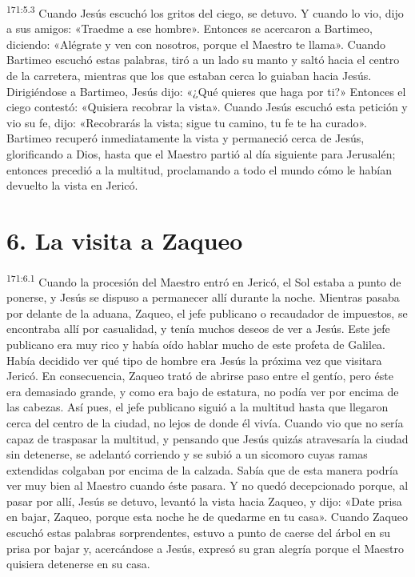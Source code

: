 \par 
\textsuperscript{171:5.3} Cuando Jesús escuchó los gritos del ciego, se detuvo. Y cuando lo vio, dijo a sus amigos: «Traedme a ese hombre». Entonces se acercaron a Bartimeo, diciendo: «Alégrate y ven con nosotros, porque el Maestro te llama». Cuando Bartimeo escuchó estas palabras, tiró a un lado su manto y saltó hacia el centro de la carretera, mientras que los que estaban cerca lo guiaban hacia Jesús. Dirigiéndose a Bartimeo, Jesús dijo: «¿Qué quieres que haga por ti?» Entonces el ciego contestó: «Quisiera recobrar la vista». Cuando Jesús escuchó esta petición y vio su fe, dijo: «Recobrarás la vista; sigue tu camino, tu fe te ha curado». Bartimeo recuperó inmediatamente la vista y permaneció cerca de Jesús, glorificando a Dios, hasta que el Maestro partió al día siguiente para Jerusalén; entonces precedió a la multitud, proclamando a todo el mundo cómo le habían devuelto la vista en Jericó.

\section*{6. La visita a Zaqueo}
\par 
\textsuperscript{171:6.1} Cuando la procesión del Maestro entró en Jericó, el Sol estaba a punto de ponerse, y Jesús se dispuso a permanecer allí durante la noche. Mientras pasaba por delante de la aduana, Zaqueo, el jefe publicano o recaudador de impuestos, se encontraba allí por casualidad, y tenía muchos deseos de ver a Jesús. Este jefe publicano era muy rico y había oído hablar mucho de este profeta de Galilea. Había decidido ver qué tipo de hombre era Jesús la próxima vez que visitara Jericó. En consecuencia, Zaqueo trató de abrirse paso entre el gentío, pero éste era demasiado grande, y como era bajo de estatura, no podía ver por encima de las cabezas. Así pues, el jefe publicano siguió a la multitud hasta que llegaron cerca del centro de la ciudad, no lejos de donde él vivía. Cuando vio que no sería capaz de traspasar la multitud, y pensando que Jesús quizás atravesaría la ciudad sin detenerse, se adelantó corriendo y se subió a un sicomoro cuyas ramas extendidas colgaban por encima de la calzada. Sabía que de esta manera podría ver muy bien al Maestro cuando éste pasara. Y no quedó decepcionado porque, al pasar por allí, Jesús se detuvo, levantó la vista hacia Zaqueo, y dijo: «Date prisa en bajar, Zaqueo, porque esta noche he de quedarme en tu casa». Cuando Zaqueo escuchó estas palabras sorprendentes, estuvo a punto de caerse del árbol en su prisa por bajar y, acercándose a Jesús, expresó su gran alegría porque el Maestro quisiera detenerse en su casa.

